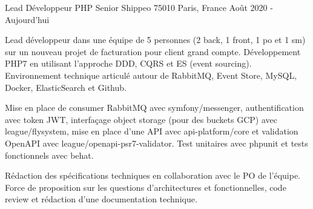 \cventry
{Lead Développeur PHP Senior} %
{Shippeo} %
{75010 Paris, France} %
{Août 2020 - Aujourd'hui} %
{
\begin{cvitems} %
    \item
    {
        Lead développeur dans une équipe de 5 personnes (2 back, 1 front, 1 po et 1 sm) sur un nouveau projet de facturation
        pour client grand compte. Développement PHP7 en utilisant l'approche DDD, CQRS et ES (event sourcing). Environnement 
        technique articulé autour de RabbitMQ, Event Store, MySQL, Docker, ElasticSearch et Github. 
    }
    \item
    {
        Mise en place de consumer RabbitMQ avec symfony/messenger, authentification avec token JWT, interfaçage object 
        storage (pour des buckets GCP) avec league/flysystem, mise en place d'une API avec api-platform/core et validation 
        OpenAPI avec league/openapi-psr7-validator. Test unitaires avec phpunit et tests fonctionnels avec behat.
    }
    \item
    {
        Rédaction des spécifications techniques en collaboration avec le PO de l'équipe. Force de proposition sur 
        les questions d’architectures et fonctionnelles, code review et rédaction d'une documentation technique.
    }
\end{cvitems}
}
